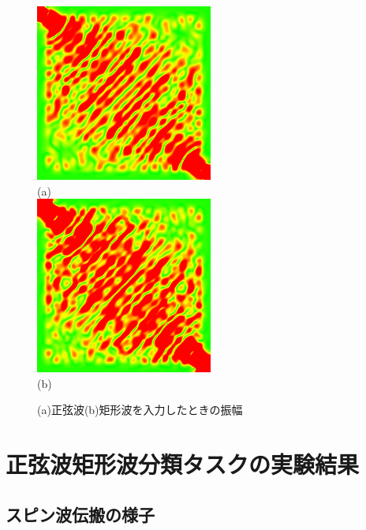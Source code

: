 \documentclass[a4j, twocolumn]{jsarticle}
\begin{document}
\begin{figure}
\centering
\includegraphics[width=0.5\hsize]{./figures/capture/sin/32i_l_hil_5760} \\
(a)\\
\includegraphics[width=0.5\hsize]{./figures/capture/sqr/32i_l_hil_7060} \\
(b)\\ 
\caption{(a)正弦波(b)矩形波を入力したときの振幅}
\label{fig:hil}
\end{figure}

\section{正弦波矩形波分類タスクの実験結果}%
\label{sec:result}

\subsection{スピン波伝搬の様子}
\label{subsec:spinwave}
\end{document}
